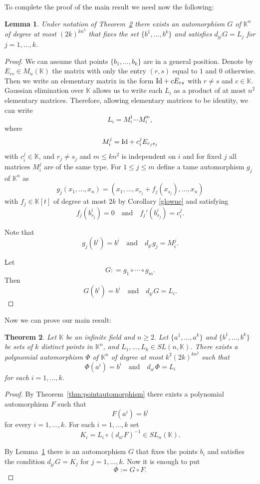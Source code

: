 \documentclass{amsart}
\newtheorem{theorem}{Theorem}[section]
\newtheorem{lemma}[theorem]{Lemma}
\newcommand{\K}{\mathbb{K}}
\begin{document}
To complete the proof of the main result we need now the following: 

\begin{lemma}\label{lem:differentials}
	Under notation of Theorem~\ref{thm:main} there exists an automorphism $G$ of $\K^n$ of degree at most $(2k)^{kn^2} $ that fixes the set  
	$\{b^1,\ldots,b^k\}$ and satisfies $d_{b^j}G=L_j$ for $j=1,\dots, k$.
\end{lemma}


\begin{proof}
We can assume that points  $\{b_1,\ldots,b_k\}$ are in a general position.
Denote by $E_{rs}\in M_n(\K)$ the  matrix with only the entry $(r,s)$ equal to $1$ and $0$ otherwise. Then we write an elementary matrix in the form $\textup{Id}+c E_{rs}$ with $r\neq s$ and $c\in\K$. Gaussian elimination over $\K$ allows us  to write each $L_i$ as a product of at most $n^2$ elementary matrices. Therefore, allowing elementary matrices to be identity, we can write
$$L_i=M_i^1\cdots M_i^{m}, $$
where
$$M_i^j= \textup{Id}+c_i^j E_{r_js_j}$$
with  $c_i^j\in\K$, and $r_j\neq s_j$  and $m\leq k n^2$ is independent on $i$ and for fixed $j$ all matrices $M_i^j$ are of the same type.
For $1\leq j\leq m$ define a tame automorphism $g_j$ of $\K^n$ as
$$g_j(x_1,\dots,x_n)=(x_1,\dots,x_{r_j}+f_j(x_{s_j}),\dots,x_n)$$
with $f_j\in\K[t]$ of degree at most $2k$
by Corollary \ref{glowne}  and 
satisfying
$$  f_j(b^i_{s_j})=0 \quad \text{and} \quad  f_j'(b^i_{s_j})=c_i^j .$$


Note that
$$g_j(b^i)=b^i \quad \text{and} \quad d_{b^i}g_j=M_i^j.$$

Let
$$G: =g_1\circ\cdots\circ g_m.$$
Then
$$G(b^i)=b^i \quad \text{and} \quad d_{b^i}G=L_i.$$
\end{proof}



Now we can prove our main result:


\begin{theorem}\label{thm:main}
Let  $\K$ be an infinite field and $n\ge 2.$ Let  $\{a^1,\ldots,a^k\}$ and $\{b^1,\ldots,b^k\}$ be sets of $k$ distinct points in $\K^n$,  and $L_1,\ldots,L_k\in SL(n,\K)$. 
There exists a polynomial automorphism $\Phi$ of $\K^n$ of degree at most $k^2(2k)^{kn^2}$
such that
$$ \Phi(a^i)=b^i \quad \text{and}\quad   d_{a^i}\Phi=L_i  $$
for each $i=1,\dots,k$.
\end{theorem}

\begin{proof}
By Theorem~\ref{thm:pointautomorphism} there exists a polynomial automorphism $F$  such that
$$F(a^i)=b^i$$
for every $i=1,\dots,k$. 
For each $i=1,\dots,k$ set
$$K_i=L_i\circ(d_{a^i}F)^{-1}\in SL_n(\K).$$

By Lemma~\ref{lem:differentials} there is  an automorphism $G$ that fixes the points $b_i$ and satisfies the condition  $d_{b^j}G=K_j$ for $j=1,\dots, k.$
Now it is enough to put 
$$\Phi:= G\circ F. $$
\end{proof}
\end{document}

